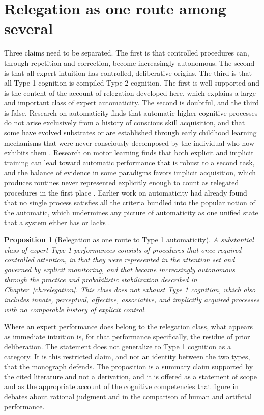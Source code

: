 \documentclass[11pt]{report}
\newtheorem{proposition}{Proposition}[chapter]
\theoremstyle{remark}
\theoremstyle{definition}
\begin{document}
\section{Relegation as one route among several}

Three claims need to be separated. The first is that controlled procedures can, through repetition and correction, become increasingly autonomous. The second is that all expert intuition has controlled, deliberative origins. The third is that all Type 1 cognition is compiled Type 2 cognition. The first is well supported and is the content of the account of relegation developed here, which explains a large and important class of expert automaticity. The second is doubtful, and the third is false. Research on automaticity finds that automatic higher-cognitive processes do not arise exclusively from a history of conscious skill acquisition, and that some have evolved substrates or are established through early childhood learning mechanisms that were never consciously decomposed by the individual who now exhibits them \cite{bargh2012}. Research on motor learning finds that both explicit and implicit training can lead toward automatic performance that is robust to a second task, and the balance of evidence in some paradigms favors implicit acquisition, which produces routines never represented explicitly enough to count as relegated procedures in the first place \cite{kal2018}. Earlier work on automaticity had already found that no single process satisfies all the criteria bundled into the popular notion of the automatic, which undermines any picture of automaticity as one unified state that a system either has or lacks \cite{bargh1992}.

\begin{proposition}[Relegation as one route to Type 1 automaticity]\label{prop:oneroute}
A substantial class of expert Type 1 performances consists of procedures that once required controlled attention, in that they were represented in the attention set and governed by explicit monitoring, and that became increasingly autonomous through the practice and probabilistic stabilization described in Chapter~\ref{ch:relegation}. This class does not exhaust Type 1 cognition, which also includes innate, perceptual, affective, associative, and implicitly acquired processes with no comparable history of explicit control.
\end{proposition}

Where an expert performance does belong to the relegation class, what appears as immediate intuition is, for that performance specifically, the residue of prior deliberation. The statement does not generalize to Type 1 cognition as a category. It is this restricted claim, and not an identity between the two types, that the monograph defends. The proposition is a summary claim supported by the cited literature and not a derivation, and it is offered as a statement of scope and as the appropriate account of the cognitive competencies that figure in debates about rational judgment and in the comparison of human and artificial performance.
\end{document}

